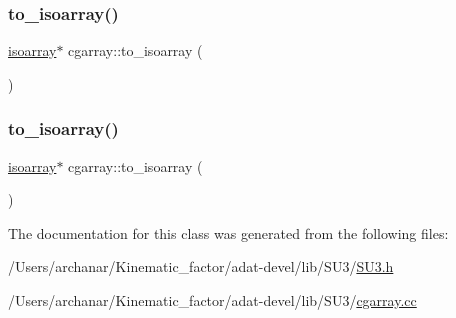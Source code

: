 \mbox{\label{classcgarray_ade5be135cf4078de471bfb31497b0efa}} 
\subsubsection{\texorpdfstring{to\_isoarray()}{to\_isoarray()}\hspace{0.1cm}{\footnotesize\ttfamily [2/3]}}
{\footnotesize\ttfamily \mbox{\hyperlink{classisoarray}{isoarray}}$\ast$ cgarray\+::to\+\_\+isoarray (\begin{DoxyParamCaption}{ }\end{DoxyParamCaption})}

\mbox{\label{classcgarray_ade5be135cf4078de471bfb31497b0efa}} 
\subsubsection{\texorpdfstring{to\_isoarray()}{to\_isoarray()}\hspace{0.1cm}{\footnotesize\ttfamily [3/3]}}
{\footnotesize\ttfamily \mbox{\hyperlink{classisoarray}{isoarray}}$\ast$ cgarray\+::to\+\_\+isoarray (\begin{DoxyParamCaption}{ }\end{DoxyParamCaption})}



The documentation for this class was generated from the following files\+:\begin{DoxyCompactItemize}
\item 
/\+Users/archanar/\+Kinematic\+\_\+factor/adat-\/devel/lib/\+S\+U3/\mbox{\hyperlink{adat-devel_2lib_2SU3_2SU3_8h}{S\+U3.\+h}}\item 
/\+Users/archanar/\+Kinematic\+\_\+factor/adat-\/devel/lib/\+S\+U3/\mbox{\hyperlink{adat-devel_2lib_2SU3_2cgarray_8cc}{cgarray.\+cc}}\end{DoxyCompactItemize}
